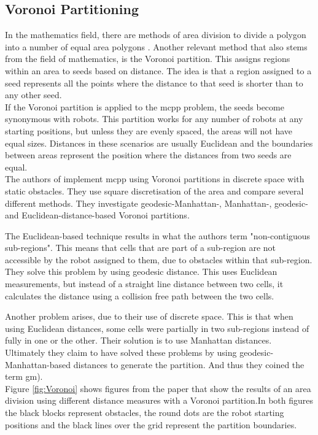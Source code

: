 \subsection{Voronoi Partitioning}
\label{sec:LR-Voronoi}
In the mathematics field, there are methods of area division to divide a polygon into a number of equal area polygons \cite{Nandakumar2012}. Another relevant method that also stems from the field of mathematics, is the Voronoi partition. This assigns regions within an area to seeds based on distance. The idea is that a region assigned to a seed represents all the points where the distance to that seed is shorter than to any other seed.\\

If the Voronoi partition is applied to the \ac{mcpp} problem, the seeds become synonymous with robots. This partition works for any number of robots at any starting positions, but unless they are evenly spaced, the areas will not have equal sizes. Distances in these scenarios are usually Euclidean and the boundaries between areas represent the position where the distances from two seeds are equal.\\ 
The authors of \cite{Nair2020} implement \ac{mcpp} using Voronoi partitions in discrete space with static obstacles. They use square discretisation of the area and compare several different methods. They investigate geodesic-Manhattan-, Manhattan-, geodesic- and Euclidean-distance-based Voronoi partitions. 

The Euclidean-based technique results in what the authors term "non-contiguous sub-regions". This means that cells that are part of a sub-region are not accessible by the robot assigned to them, due to obstacles within that sub-region. They solve this problem by using geodesic distance. This uses Euclidean measurements, but instead of a straight line distance between two cells, it calculates the distance using a collision free path between the two cells. 

Another problem arises, due to their use of discrete space. This is that when using Euclidean distances, some cells were partially in two sub-regions instead of fully in one or the other. Their solution is to use Manhattan distances. Ultimately they claim to have solved these problems by using geodesic-Manhattan-based distances to generate the partition. And thus they coined the term \ac{gm}).\\
Figure \ref{fig:Voronoi} shows figures from the paper that show the results of an area division using different distance measures with a Voronoi partition.In both figures the black blocks represent obstacles, the round dots are the robot starting positions and the black lines over the grid represent the partition boundaries. 

